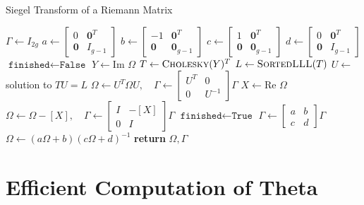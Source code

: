 \documentclass[12]{article}
\begin{document}
\begin{algorithm}
\caption{Siegel Transform of a Riemann Matrix}
\label{alg: siegel}
\begin{algorithmic}

  \State $\Gamma \gets I_{2g}$
  \State $a \gets \left[ \begin{smallmatrix} 0 & \mathbf{0}^T \\
      \mathbf{0} & I_{g-1} \end{smallmatrix} \right]$
  \State $b \gets \left[ \begin{smallmatrix} -1 & \mathbf{0}^T \\
      \mathbf{0} & \mathbf{0}_{g-1} \end{smallmatrix} \right]$
  \State $c \gets \left[ \begin{smallmatrix} 1 & \mathbf{0}^T \\
      \mathbf{0} & \mathbf{0}_{g-1} \end{smallmatrix} \right]$
  \State $d \gets \left[ \begin{smallmatrix} 0 & \mathbf{0}^T \\
      \mathbf{0} & I_{g-1} \end{smallmatrix} \right]$
  \State $\texttt{finished} \gets \texttt{False}$
    \State $Y \gets \text{Im } \Omega$
    \State $T \gets \textsc{Cholesky}(Y)^T$
    \State $L \gets \textsc{SortedLLL}(T)$
    \State $U \gets$ solution to $TU = L$
    \State $\Omega \gets U^T \Omega U, \quad \Gamma \gets \left[
      \begin{smallmatrix} U^T & 0 \\ 0 & U^{-1} \end{smallmatrix}
      \right] \Gamma$
    \State $X \gets \text{Re } \Omega$
    \State $\Omega \gets \Omega - [X], \quad \Gamma \gets \left[
      \begin{smallmatrix} I & -[X] \\ 0 & I \end{smallmatrix}
      \right] \Gamma$
      \State $\texttt{finished} \gets \texttt{True}$
    \Else
      \State $\Gamma \gets \left[
        \begin{smallmatrix} a & b \\ c & d \end{smallmatrix}
        \right] \Gamma$
      \State $\Omega \gets (a\Omega + b)(c \Omega + d)^{-1}$
    \EndIf
  \EndWhile
  \State \textbf{return} $\Omega, \Gamma$
\EndProcedure
\end{algorithmic}
\end{algorithm}


\section{Efficient Computation of Theta}\label{sec:computation}





\end{document}
